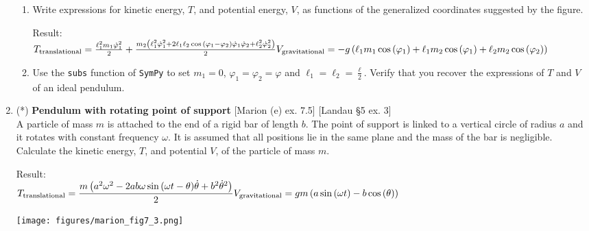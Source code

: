 \documentclass[11pt, a4paper, twoside]{article}
\begin{document}
\begin{enumerate}
	\begin{enumerate}
		\item Write expressions for kinetic energy, $T$, and potential energy, $V$, as functions of the generalized coordinates suggested by the figure.
		
		Result:\\
	\(
		T_\text{translational} = \frac{\ell_{1}^{2} m_{1} \dot{\varphi}_{1}^{2}}{2} + \frac{m_{2} \left(\ell_{1}^{2} \dot{\varphi}_{1}^{2} + 2 \ell_{1} \ell_{2} \cos{\left(\varphi_{1} - \varphi_{2} \right)} \dot{\varphi}_{1} \dot{\varphi}_{2} + \ell_{2}^{2} \dot{\varphi}_{2}^{2}\right)}{2}\\
		V_\text{gravitational} = - g \left(\ell_{1} m_{1} \cos{\left(\varphi_{1} \right)} + \ell_{1} m_{2} \cos{\left(\varphi_{1} \right)} + \ell_{2} m_{2} \cos{\left(\varphi_{2} \right)}\right)
	\)
		\item Use the \verb'subs' function of \verb'SymPy' to set $m_1=0$, $\varphi_1 = \varphi_2 = \varphi$ and  $\ell_1 = \ell_2 = \frac{\ell}{2}$. 
		Verify that you recover the expressions of $T$ and $V$ of an ideal pendulum.
	\end{enumerate}


\item
	\begin{minipage}[t][7.1cm]{0.5\textwidth}
		(*) \textbf{Pendulum with rotating point of support} [Marion (e) ex. 7.5] [Landau \S5 ex. 3]\\
		A particle of mass $m$ is attached to the end of a rigid bar of length $b$. The point of support is linked to a vertical circle of radius $a$ and it rotates with constant frequency $\omega$. It is assumed that all positions lie in the same plane and the mass of the bar is negligible. Calculate the kinetic energy, $T$, and potential $V$, of the particle of mass $m$.

		Result:\\
		\(
			T_\text{translational} = \dfrac{m \left(a^{2} \omega^{2} - 2 a b \omega \sin{\left(\omega t - \theta \right)} \dot{\theta} + b^{2} \dot{\theta}^{2}\right)}{2}\\
			V_\text{gravitational} = g m \left(a \sin{\left(\omega t \right)} - b \cos{\left(\theta \right)}\right)
		\)
	\end{minipage}
	\begin{minipage}[c][3cm][t]{0.5\textwidth}
		\texttt{[image: figures/marion\_fig7\_3.png]}
	\end{minipage}




\end{enumerate}
\end{document}

